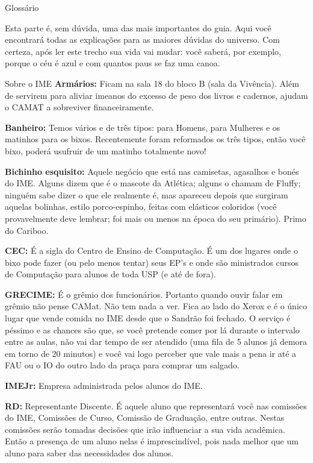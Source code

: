 \begin{secao}{Glossário}

Esta parte é, sem dúvida, uma das mais importantes do guia. Aqui você
encontrará todas as explicações para as maiores dúvidas do universo. Com
certeza, após ler este trecho sua vida vai mudar: você saberá, por exemplo,
porque o céu é azul e com quantos paus se faz uma canoa.

\begin{subsecao}{Sobre o IME}
{\bf Armários:} Ficam na sala 18 do bloco B (sala da Vivência). Além de
servirem para aliviar imeanos do excesso de peso dos livros e cadernos, ajudam
o CAMAT a sobreviver financeiramente.

{\bf Banheiro:} Temos vários e de três tipos: para Homens, para Mulheres e os
matinhos para os bixos. Recentemente foram reformados os três tipos, então você
bixo, poderá usufruir de um matinho totalmente novo!

{\bf Bichinho esquisito:} Aquele negócio que está nas camisetas, agasalhos e
bonés do IME. Alguns dizem que é o mascote da Atlética; alguns o chamam de
Fluffy; ninguém sabe dizer o que ele realmente é, mas apareceu depois que
surgiram aquelas bolinhas, estilo porco-espinho, feitas com elásticos
coloridos (você provavelmente deve lembrar; foi mais ou menos na época do seu
primário). Primo do Cariboo.

{\bf CEC:} É a sigla do Centro de Ensino de Computação. É um dos lugares onde o
bixo pode fazer (ou pelo menos tentar) seus EP's e onde são ministrados cursos
de Computação para alunos de toda USP (e até de fora).

{\bf GRECIME:} É o grêmio dos funcionários. Portanto quando ouvir falar em
grêmio não pense CAMat. Não tem nada a ver. Fica ao lado do Xerox e é o único
lugar que vende comida no IME desde que o Sandrão foi fechado. O serviço é péssimo
e as chances são que, se você pretende comer por lá durante o intervalo entre as
aulas, não vai dar tempo de ser atendido (uma fila de 5 alunos já demora em torno
de 20 minutos) e você vai logo perceber que vale mais a pena ir até a FAU ou o IO
do outro lado da praça para comprar um salgado.

{\bf IMEJr:} Empresa administrada pelos alunos do IME.

{\bf RD:} Representante Discente. É aquele aluno que representará você nas
comissões do IME, Comissões de Curso, Comissão de Graduação, entre outras.
Nestas comissões serão tomadas decisões que irão influenciar a sua vida
acadêmica. Então a presença de um aluno nelas é imprescindível, pois nada
melhor que um aluno para saber das necessidades dos alunos.


\end{subsecao}
\end{secao}
